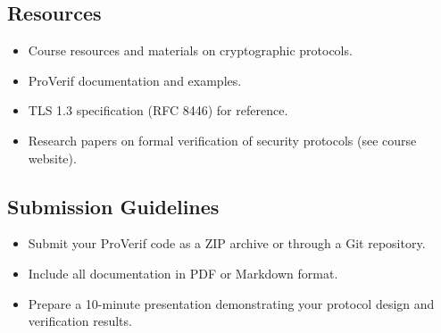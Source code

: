 \documentclass[10pt,a4paper,american]{exam}
\begin{document}
\subsection*{Resources}
\begin{itemize}
	\item Course resources and materials on cryptographic protocols.
	\item ProVerif documentation and examples.
	\item TLS 1.3 specification (RFC 8446) for reference.
	\item Research papers on formal verification of security protocols (see course website).
\end{itemize}

\subsection*{Submission Guidelines}
\begin{itemize}
	\item Submit your ProVerif code as a ZIP archive or through a Git repository.
	\item Include all documentation in PDF or Markdown format.
	\item Prepare a 10-minute presentation demonstrating your protocol design and verification results.
\end{itemize}
\end{document}

